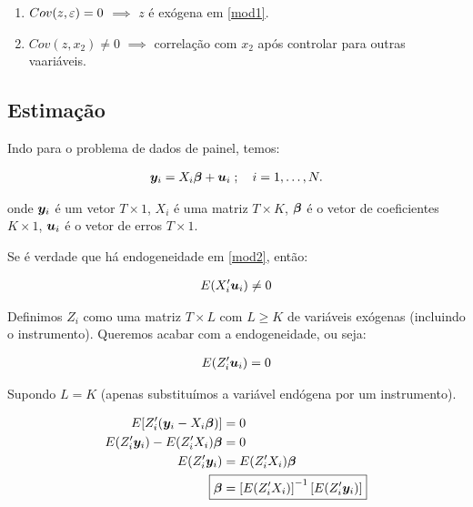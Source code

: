 \documentclass[11pt,oneside,a4paper]{article}
\numberwithin{equation}{section}
\begin{document}
\begin{enumerate}\itemsep0pt
\item $Cov(z, \varepsilon) = 0$ $\implies$  $z$ é exógena em \eqref{mod1}.
\item $Cov(z, x_{2}) \neq 0$ $\implies$  correlação com $x_{2}$ após controlar para outras vaariáveis.
\end{enumerate}

\subsection*{Estimação}

Indo para o problema de dados de painel, temos:

\vspace{-1 em}
\begin{align} \label{mod2}
	\boldsymbol{y}_{i} = X_{i} \boldsymbol{\beta} + \boldsymbol{u}_{i}
	\; ; \quad i = 1, \dots, N.
\end{align}

\noindent
onde 
$\boldsymbol{y}_{i}$ é um vetor $T \times 1$,
$X_{i}$ é uma matriz $T \times K$,
$\boldsymbol{\beta}$ é o vetor de coeficientes $K \times 1$,
$\boldsymbol{u}_{i}$ é o vetor de erros $T \times 1$.

Se é verdade que há endogeneidade em \eqref{mod2}, então:

\vspace{-1 em}
\begin{align*}
	E(X_{i}^{\prime} \boldsymbol{u}_{i}) \neq 0
\end{align*}

Definimos $Z_{i}$ como uma matriz $T \times L$ com $L \geq K$ de variáveis exógenas (incluindo o instrumento).
Queremos acabar com a endogeneidade, ou seja:

\vspace{-1 em}
\begin{align*}
	E(Z_{i}^{\prime} \boldsymbol{u}_{i}) = 0
\end{align*}

Supondo $L = K$ (apenas substituímos a variável endógena por um instrumento).

\vspace{-1 em}
\begin{align*}
E[ Z_{i}^{\prime} ( \mbs{y}_{i} - X_{i} \mbs{\beta} ) ] &= 0
\\
E( Z_{i}^{\prime} \mbs{y}_{i} ) - E( Z_{i}^{\prime} X_{i} ) \mbs{\beta} &= 0
\\
E( Z_{i}^{\prime} \mbs{y}_{i} ) &= E( Z_{i}^{\prime} X_{i} ) \mbs{\beta}
\\
\Aboxed{
\mbs{\beta} &=
\left[ E( Z_{i}^{\prime} X_{i} ) \right]^{-1}
\left[ E( Z_{i}^{\prime} \mbs{y}_{i} ) \right]
}
\end{align*}
\end{document}
